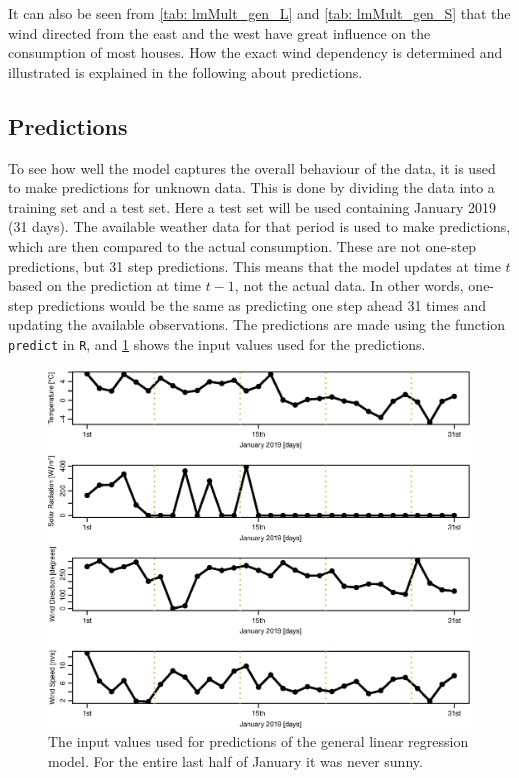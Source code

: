 \noindent It can also be seen from \cref{tab: lmMult_gen_L} and \cref{tab: lmMult_gen_S} that the wind directed from the east and the west have great influence on the consumption of most houses. How the exact wind dependency is determined and illustrated is explained in the following about predictions.

\subsection{Predictions}
\noindent To see how well the model captures the overall behaviour of the data, it is used to make predictions for unknown data. This is done by dividing the data into a training set and a test set. Here a test set will be used containing January 2019 (31 days). The available weather data for that period is used to make predictions, which are then compared to the actual consumption. These are not one-step predictions, but 31 step predictions. This means that the model updates at time $t$ based on the prediction at time $t-1$, not the actual data. In other words, one-step predictions would be the same as predicting one step ahead 31 times and updating the available observations. The predictions are made using the function \texttt{predict} in \texttt{R}, and \cref{fig: weather_pred} shows the input values used for the predictions.
\begin{figure}
    \centering
    \includegraphics[width=1.\textwidth]{../../../figures/TestWeatherDays.eps}
    \caption{The input values used for predictions of the general linear regression model. For the entire last half of January it was never sunny.}
    \label{fig: weather_pred}
\end{figure}
